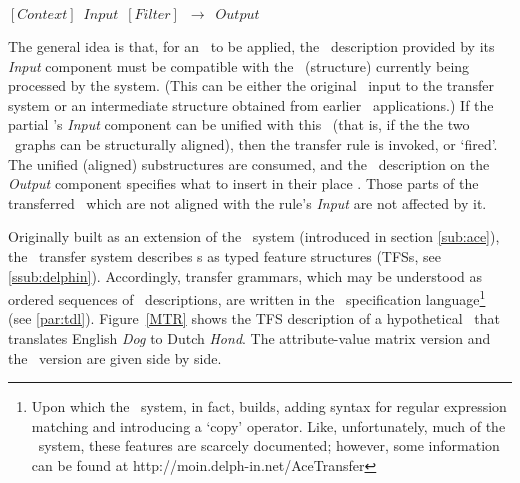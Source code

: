 \begin{exe}
    \ex\label{ex:mtr-schematic}
        $[Context] \enspace Input \enspace [Filter] \enspace
        \longrightarrow  \enspace Output$
\end{exe}

The general idea is that, for an \mtr\ to be applied, the \mrs\ description
provided by its \emph{Input} component must be compatible with the \mrs\
(structure) currently being processed by the system. (This can be either the
original \mrs\ input to the transfer system or an intermediate structure
obtained from earlier \mtr\ applications.) If the partial \mtr's \emph{Input}
component can be unified with this \mrs\ (that is, if the the two \mrs\ graphs
can be structurally aligned), then the transfer rule is invoked, or `fired'.
The unified (aligned) substructures are consumed, and the \mrs\ description on
the \emph{Output} component specifies what to insert in their place
\citep{oepen2008transfer}. Those parts of the transferred \mrs\ which are not
aligned with the rule's \emph{Input} are not affected by it.

Originally built as an extension of the \lkb\ system (introduced in section
\ref{sub:ace}), the \logon\ transfer system describes \mtr s as typed feature
structures (TFSs, see \ref{ssub:delphin}). Accordingly, transfer grammars,
which may be understood as ordered sequences of \mtr\ descriptions, are written
in the \tdl\ specification language\footnote{Upon which the \logon\ system, in
fact, builds, adding syntax for regular expression matching and introducing a
`copy' operator. Like, unfortunately, much of the \logon\ system, these
features are scarcely documented; however, some information can be found at
http://moin.delph-in.net/AceTransfer } (see \ref{par:tdl}). Figure~\ref{MTR}
shows the TFS description of a hypothetical \mtr\ that translates English
\emph{Dog} to Dutch \emph{Hond}. The attribute-value matrix version and the
\tdl\ version are given side by side.

